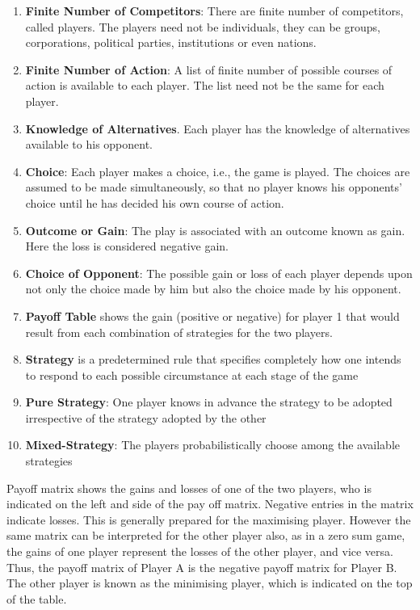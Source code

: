 \documentclass[12pt]{article}
\begin{document}
\begin{enumerate}
\item \textbf{Finite Number of Competitors}: There are finite number of competitors, called players.
The players need not be individuals, they can be groups, corporations, political parties,
institutions or even nations.
\item \textbf{Finite Number of Action}: A list of finite number of possible courses of action is available to
each player. The list need not be the same for each player.
\item \textbf{Knowledge of Alternatives}. Each player has the knowledge of alternatives available to his
opponent.
\item \textbf{Choice}: Each player makes a choice, i.e., the game is played. The choices are assumed to be
made simultaneously, so that no player knows his opponents' choice until he has decided his own
course of action.
\item \textbf{Outcome or Gain}: The play is associated with an outcome known as gain. Here the loss is
considered negative gain.
\item \textbf{Choice of Opponent}: The possible gain or loss of each player depends upon not only the
choice made by him but also the choice made by his opponent.
\item \textbf{Payoff Table} shows the gain (positive or negative) for player 1 that would result from each combination of strategies for the two players.
\item \textbf{Strategy} is a predetermined rule that specifies completely how one intends to respond to each possible circumstance at each stage of the game
\item \textbf{Pure Strategy}: One player knows in advance the strategy to be adopted irrespective of the strategy adopted by the other
\item \textbf{Mixed-Strategy}: The players probabilistically choose among the available strategies
\end{enumerate}

Payoff matrix shows the gains and losses of one of the two players, who is indicated on the left
and side of the pay off matrix. Negative entries in the matrix indicate losses. This is generally
prepared for the maximising player. However the same matrix can be interpreted for the other
player also, as in a zero sum game, the gains of one player represent the losses of the other
player, and vice versa. Thus, the payoff matrix of Player A is the negative payoff matrix for Player B.
The other player is known as the minimising player, which is indicated on the top of the table.
\end{document}
